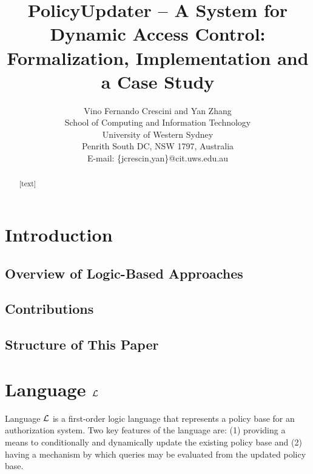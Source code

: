 \documentclass[10pt, twocolumn]{article}
\begin{document}
  \title{
    PolicyUpdater -- A System for Dynamic Access Control:  \\
    Formalization, Implementation and a Case Study
  }

  \author{
    Vino Fernando Crescini and Yan Zhang                   \\
    School of Computing and Information Technology         \\
    University of Western Sydney                           \\
    Penrith South DC, NSW 1797, Australia                  \\
    E-mail: \{jcrescin,yan\}@cit.uws.edu.au
  }

  \date{}

  \maketitle

  \begin{abstract}
    [text]
  \end{abstract}

  \section{Introduction}

    \subsection{Overview of Logic-Based Approaches}

    \subsection{Contributions}

    \subsection{Structure of This Paper}

  \section{Language $\cal{L}$}

    Language $\cal{L}$ is a first-order logic language that represents a policy
    base for an authorization system. Two key features of the language are: (1)
    providing a means to conditionally and dynamically update the existing
    policy base and (2) having a mechanism by which queries may be evaluated
    from the updated policy base.
\end{document}
